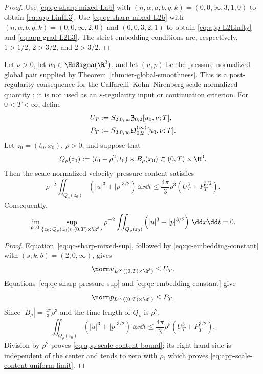 \begin{proof}
Use \eqref{eq:qc-sharp-mixed-Lab} with
\((n,\alpha,a,b,q,k)=(0,0,\infty,3,1,0)\) to obtain
\eqref{eq:app-LinfL3}.  Use \eqref{eq:qc-sharp-mixed-L2b} with
\((n,\alpha,b,q,k)=(0,0,\infty,2,0)\) and
\((0,0,3,2,1)\) to obtain \eqref{eq:app-L2Linfty} and
\eqref{eq:app-grad-L2L3}.  The strict embedding conditions are,
respectively, \(1>1/2\), \(2>3/2\), and \(2>3/2\).
\end{proof}

\begin{corollary}
\label{thm:app-scale-content-extinction}
Let \(\nu>0\), let \(u_0\in\HsSigma(\R^3)\), and let \((u,p)\) be
the pressure-normalized global pair supplied by
Theorem~\ref{thm:ier-global-smoothness}.  This is a post-regularity
consequence for the Caffarelli--Kohn--Nirenberg scale-normalized quantity
\cite{CKN1982}; it is not used as an \(\varepsilon\)-regularity input or
continuation criterion.
For \(0<T<\infty\), define
\begin{align}
 U_T&:=S_{2,0,\infty}\mathfrak Z_{0,2}[u_0,\nu;T],\notag\\
 P_T&:=S_{2,0,\infty}
 \mathfrak Q^{(\infty)}_{0,2}[u_0,\nu;T].
 \label{eq:app-scale-content-majorants}
\end{align}
Let \(z_0=(t_0,x_0)\), \(\rho>0\), and suppose that
\[
 Q_\rho(z_0):=(t_0-\rho^2,t_0)\times B_\rho(x_0)
 \subset(0,T)\times\R^3.
\]
Then the scale-normalized velocity--pressure content satisfies
\begin{equation}
 \rho^{-2}\iint_{Q_\rho(z_0)}
 \left(|u|^3+|p|^{3/2}\right)\,\dd x\dd t
 \le\frac{4\pi}{3}\rho^3
 \left(U_T^3+P_T^{3/2}\right).
 \label{eq:app-scale-content-bound}
\end{equation}
Consequently,
\begin{equation}
 \lim_{\rho\downarrow0}
 \sup_{\{z_0:\,Q_\rho(z_0)\subset(0,T)\times\R^3\}}
 \rho^{-2}\iint_{Q_\rho(z_0)}
 \left(|u|^3+|p|^{3/2}\right)\,\dd x\dd t=0.
 \label{eq:app-scale-content-uniform-limit}
\end{equation}
\end{corollary}

\begin{proof}
Equation~\eqref{eq:qc-sharp-mixed-sup}, followed by
\eqref{eq:qc-embedding-constant} with \((s,k,b)=(2,0,\infty)\), gives
\[
 \norm u_{L^\infty((0,T)\times\R^3)}\le U_T.
\]
Equations~\eqref{eq:qc-sharp-pressure-sup} and
\eqref{eq:qc-embedding-constant} give
\[
 \norm p_{L^\infty((0,T)\times\R^3)}\le P_T.
\]
Since \(|B_\rho|=\frac{4\pi}{3}\rho^3\) and the time length of
\(Q_\rho\) is \(\rho^2\),
\[
 \iint_{Q_\rho(z_0)}\left(|u|^3+|p|^{3/2}\right)\,\dd x\dd t
 \le\frac{4\pi}{3}\rho^5
 \left(U_T^3+P_T^{3/2}\right).
\]
Division by \(\rho^2\) proves \eqref{eq:app-scale-content-bound}; its
right-hand side is independent of the center and tends to zero with
\(\rho\), which proves \eqref{eq:app-scale-content-uniform-limit}.
\end{proof}

